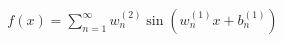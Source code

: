 \documentclass[preview]{standalone}
\begin{document}
\begin{align*}
f(x) =  \sum_{n=1}^{\infty} w_n^{(2)} \sin(w_n^{(1)}x+b_n^{(1)})
\end{align*}
\end{document}
